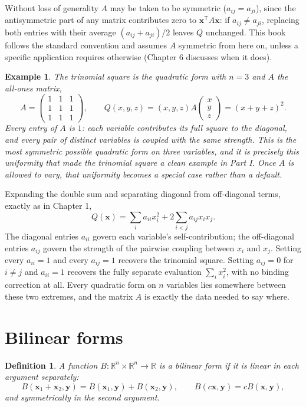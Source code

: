 \documentclass[11pt]{book}
\newtheorem{definition}[theorem]{Definition}
\newtheorem{example}[theorem]{Example}
\begin{document}
Without loss of generality $A$ may be taken to be symmetric ($a_{ij}=a_{ji}$), since the antisymmetric part of any matrix contributes zero to $\mathbf{x}^{\mathsf T}A\mathbf{x}$: if $a_{ij}\ne a_{ji}$, replacing both entries with their average $(a_{ij}+a_{ji})/2$ leaves $Q$ unchanged. This book follows the standard convention and assumes $A$ symmetric from here on, unless a specific application requires otherwise (Chapter 6 discusses when it does).

\begin{example}
The trinomial square is the quadratic form with $n=3$ and $A$ the all-ones matrix,
\[
A = \begin{pmatrix}1&1&1\\1&1&1\\1&1&1\end{pmatrix}, \qquad Q(x,y,z) = (x,y,z)A\begin{pmatrix}x\\y\\z\end{pmatrix} = (x+y+z)^2.
\]
Every entry of $A$ is $1$: each variable contributes its full square to the diagonal, and every pair of distinct variables is coupled with the same strength. This is the most symmetric possible quadratic form on three variables, and it is precisely this uniformity that made the trinomial square a clean example in Part I. Once $A$ is allowed to vary, that uniformity becomes a special case rather than a default.
\end{example}

Expanding the double sum and separating diagonal from off-diagonal terms, exactly as in Chapter 1,
\[
Q(\mathbf{x}) = \sum_i a_{ii}x_i^2 + 2\sum_{i<j}a_{ij}x_ix_j.
\]
The diagonal entries $a_{ii}$ govern each variable's self-contribution; the off-diagonal entries $a_{ij}$ govern the strength of the pairwise coupling between $x_i$ and $x_j$. Setting every $a_{ii}=1$ and every $a_{ij}=1$ recovers the trinomial square. Setting $a_{ij}=0$ for $i\ne j$ and $a_{ii}=1$ recovers the fully separate evaluation $\sum_i x_i^2$, with no binding correction at all. Every quadratic form on $n$ variables lies somewhere between these two extremes, and the matrix $A$ is exactly the data needed to say where.

\section{Bilinear forms}

\begin{definition}
A function $B:\mathbb{R}^n\times\mathbb{R}^n \to \mathbb{R}$ is a \emph{bilinear form} if it is linear in each argument separately:
\[
B(\mathbf{x}_1+\mathbf{x}_2,\mathbf{y}) = B(\mathbf{x}_1,\mathbf{y})+B(\mathbf{x}_2,\mathbf{y}), \qquad B(c\mathbf{x},\mathbf{y})=cB(\mathbf{x},\mathbf{y}),
\]
and symmetrically in the second argument.
\end{definition}
\end{document}
